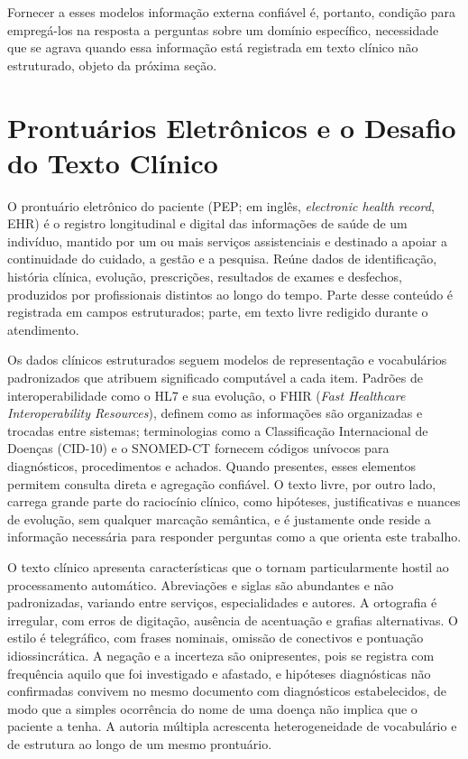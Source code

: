 Fornecer a esses modelos informação externa confiável é, portanto, condição para empregá-los na resposta a perguntas sobre um domínio específico, necessidade que se agrava quando essa informação está registrada em texto clínico não estruturado, objeto da próxima seção.

\section{Prontuários Eletrônicos e o Desafio do Texto Clínico}\label{sec:prontuarios}

O prontuário eletrônico do paciente (PEP; em inglês, \textit{electronic health record}, EHR) é o registro longitudinal e digital das informações de saúde de um indivíduo, mantido por um ou mais serviços assistenciais e destinado a apoiar a continuidade do cuidado, a gestão e a pesquisa. Reúne dados de identificação, história clínica, evolução, prescrições, resultados de exames e desfechos, produzidos por profissionais distintos ao longo do tempo. Parte desse conteúdo é registrada em campos estruturados; parte, em texto livre redigido durante o atendimento.

Os dados clínicos estruturados seguem modelos de representação e vocabulários padronizados que atribuem significado computável a cada item. Padrões de interoperabilidade como o HL7 e sua evolução, o FHIR (\textit{Fast Healthcare Interoperability Resources}), definem como as informações são organizadas e trocadas entre sistemas; terminologias como a Classificação Internacional de Doenças (CID-10) e o SNOMED-CT fornecem códigos unívocos para diagnósticos, procedimentos e achados. Quando presentes, esses elementos permitem consulta direta e agregação confiável. O texto livre, por outro lado, carrega grande parte do raciocínio clínico, como hipóteses, justificativas e nuances de evolução, sem qualquer marcação semântica, e é justamente onde reside a informação necessária para responder perguntas como a que orienta este trabalho.

O texto clínico apresenta características que o tornam particularmente hostil ao processamento automático. Abreviações e siglas são abundantes e não padronizadas, variando entre serviços, especialidades e autores. A ortografia é irregular, com erros de digitação, ausência de acentuação e grafias alternativas. O estilo é telegráfico, com frases nominais, omissão de conectivos e pontuação idiossincrática. A negação e a incerteza são onipresentes, pois se registra com frequência aquilo que foi investigado e afastado, e hipóteses diagnósticas não confirmadas convivem no mesmo documento com diagnósticos estabelecidos, de modo que a simples ocorrência do nome de uma doença não implica que o paciente a tenha. A autoria múltipla acrescenta heterogeneidade de vocabulário e de estrutura ao longo de um mesmo prontuário.

